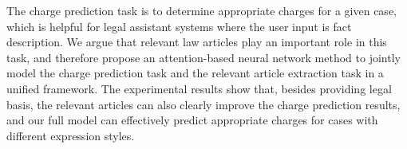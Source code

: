 The charge prediction task is to determine appropriate charges for a given case, which is helpful for legal assistant systems where the user input is fact description. We argue that relevant law articles play an important role in this task, and therefore propose an attention-based neural network method to jointly model the charge prediction task and the relevant article extraction task in a unified framework. The experimental results show that, besides providing legal basis, the relevant articles can also clearly improve the charge prediction results, and our full model can effectively predict appropriate charges for cases with different expression styles.
